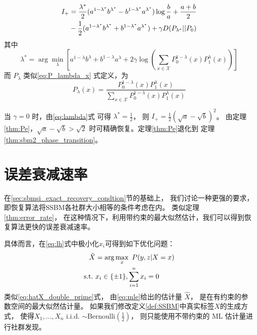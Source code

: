 \begin{lemma}\label{lem:I_plus_expression}
\begin{align}\label{equation:I+}
    I_+ &=\frac{\lambda^* }{2} (a^{1-\lambda^* }b^{\lambda^* } -
    b^{1-\lambda^* }a^{\lambda^* })\log\frac{b}{a}+\frac{a+b}{2}\notag \\
    &-\frac{1}{2}(a^{1-\lambda^*}b^{\lambda^*} +
    b^{1-\lambda^* }a^{\lambda^* })+\gamma D(P_{\lambda^* }||P_0) 
	\end{align}
	其中
	\begin{equation}\label{eq:lambda}
    \lambda^* = \arg\min_{\lambda} \left[a^{1-\lambda}b^{\lambda} +
    b^{1-\lambda}a^{\lambda} + 2\gamma \log
    \left(\sum_{x\in \mathcal{X}}P^{1-\lambda}_0(x) P^{\lambda}_1(x)
    \right)
    \right]
\end{equation}
而 $P_{\lambda}$ 类似\eqref{eq:P_lambda_x} 式定义，为
\begin{equation}\label{eq:P_lambda_0_1}
    P_{\lambda}(x) = \frac{P_0^{1-\lambda}(x) P_1^{\lambda} (x)}
    {\sum_{x \in \mathcal{X}}P_0^{1-\lambda}(x) P_1^{\lambda} (x)}        
\end{equation}

\end{lemma}




当 $\gamma=0$ 时，由\eqref{eq:lambda}式 可得 $\lambda^*=\frac{1}{2}$，
则 $I_+=\frac{1}{2}(\sqrt{a}-\sqrt{b})^2$。
由定理\ref{thm:Pe}，$\sqrt{a}-\sqrt{b} > \sqrt{2}$
时可精确恢复。定理\ref{thm:Pe}退化到
定理\ref{thm:sbm2_phase_transition}。


\section{误差衰减速率}
在\ref{sec:sbmsi_exact_recovery_condtion}节的基础上，
我们讨论一种更强的要求，即恢复算法将SSBM各社群大小相等的条件考虑在内。
类似定理\ref{thm:error_rate}，
在这种情况下，利用带约束的最大似然估计，我们可以得到恢复算法更快的误差衰减速率。

具体而言，在\eqref{eq:lh}式中极小化$x_i$可得到如下优化问题：
\begin{align}
    \hat{X} &= \arg\max_x\ P(y,z|X=x) \notag \\
    \textrm{s.t.} \ & x_i \in \{\pm 1\}, \sum_{i=1}^n x_i=0 \label{eq:mle}
\end{align}
类似\eqref{eq:hatX_double_prime}式，
由\eqref{eq:mle}给出的估计量 $\hat{X}$，
是在有约束的参数空间的最大似然估计量。
如果我们修改定义\ref{def:SSBM}中真实标签$X$的生成方式，
使得$X_1, \dots, X_n$ i.i.d. $\sim \textrm{Bernoulli}(\frac{1}{2})$，
则只能使用不带约束的 ML 估计量进行社群发现。

